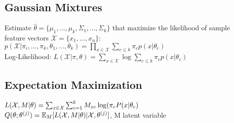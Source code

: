 
\subsection*{Gaussian Mixtures}
	Estimate $\hat{\theta} = \{\mu_1,...,\mu_k, \Sigma_1,...,\Sigma_k\}$ that maximize the likelihood of sample feature vectors $\mathcal{X} = \{x_1,..., x_n \}$: \\
	$p(\mathcal{X} | \pi_i, ..., \pi_k, \theta_1, ..., \theta_k) = \prod_{x \in \mathcal{X}} \sum_{c\leq k}  \pi_c p(x|\theta_c)$\\
	Log-Likelihood: $L(\mathcal{X} | \pi, \theta) = \sum_{x\in \mathcal{X}}
	 \log \sum_{c \leq k} \pi_c p(x|\theta_c)$
	
\subsection*{Expectation Maximization}
$L(\mathcal{X},M|\theta) = \sum_{x \in \mathcal{X}} \sum_{c=1}^k M_{xc} \log(\pi_c P(x|\theta_c)$ \\
$Q(\theta; \theta^{(j)}) = \mathbb{E}_{M}[L(\mathcal{X},M|\theta)| \mathcal{X}, \theta^{(j)}]$, M latent variable


